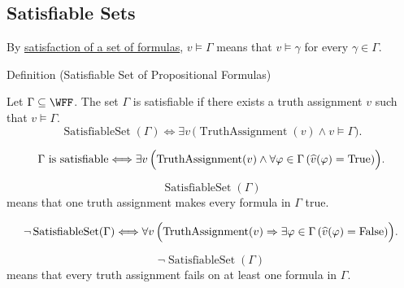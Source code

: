 \subsection*{Satisfiable Sets}

\begin{remark*}[Recall]
By \hyperref[def:satisfaction-set-propositional-logic]{satisfaction of a set of
formulas}, \(v\models\Gamma\) means that \(v\models\gamma\) for every
\(\gamma\in\Gamma\).
\end{remark*}

\begin{definitionbox}{Definition (Satisfiable Set of Propositional Formulas)}
\begin{definition}
\label{def:satisfiable-set-of-propositional-formulas}
Let \(\Gamma\subseteq\WFF\). The set \(\Gamma\) is satisfiable if there exists a
truth assignment \(v\) such that \(v\models\Gamma\).
\[
\operatorname{SatisfiableSet}(\Gamma)
\Longleftrightarrow
\exists v\,\bigl(\operatorname{TruthAssignment}(v)\land v\models\Gamma\bigr).
\]
\end{definition}
\end{definitionbox}

\begin{remark*}
\[
\Gamma\text{ is satisfiable}
\Longleftrightarrow
\exists v\,\Bigl(\operatorname{TruthAssignment}(v)\land
\forall\varphi\in\Gamma\,(\widehat v(\varphi)=\mathrm{True})\Bigr).
\]
\end{remark*}

\begin{remark*}
\[
\operatorname{SatisfiableSet}(\Gamma)
\]
means that one truth assignment makes every formula in \(\Gamma\) true.
\end{remark*}

\begin{remark*}
\[
\neg\operatorname{SatisfiableSet}(\Gamma)
\Longleftrightarrow
\forall v\,\Bigl(\operatorname{TruthAssignment}(v)\Rightarrow
\exists\varphi\in\Gamma\,(\widehat v(\varphi)=\mathrm{False})\Bigr).
\]
\end{remark*}

\begin{remark*}
\[
\neg\operatorname{SatisfiableSet}(\Gamma)
\]
means that every truth assignment fails on at least one formula in \(\Gamma\).
\end{remark*}

